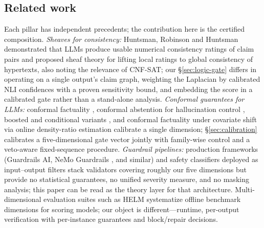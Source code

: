 \subsection{Related work}

Each pillar has independent precedents; the contribution here is the certified
composition. \emph{Sheaves for consistency:} Huntsman, Robinson and Huntsman
\cite{huntsman2024} demonstrated that LLMs produce usable numerical
consistency ratings of claim pairs and proposed sheaf theory for lifting local
ratings to global consistency of hypertexts, also noting the relevance of
CNF-SAT; our \S\ref{sec:logic-gate} differs in operating on a single output's
claim graph, weighting the Laplacian by calibrated NLI confidences with a
proven sensitivity bound, and embedding the score in a calibrated gate rather
than a stand-alone analysis. \emph{Conformal guarantees for LLMs:} conformal
factuality \cite{mohri2024}, conformal abstention for hallucination control
\cite{yadkori2024}, boosted and conditional variants \cite{cherian2024}, and
conformal factuality under covariate shift via online density-ratio estimation
\cite{cofact2026} calibrate a single dimension; \S\ref{sec:calibration}
calibrates a five-dimensional gate vector jointly with family-wise control and
a veto-aware fixed-sequence procedure. \emph{Guardrail pipelines:} production
frameworks (Guardrails AI, NeMo Guardrails \cite{rebedea2023}, and similar)
and safety classifiers deployed as input--output filters \cite{inan2023}
stack validators covering roughly our five dimensions but provide no
statistical guarantees, no unified severity measure, and no masking analysis;
this paper can be read as the theory layer for that architecture.
Multi-dimensional evaluation suites such as HELM \cite{liang2023} systematize
offline benchmark dimensions for scoring models; our object is
different---runtime, per-output verification with per-instance guarantees and
block/repair decisions.
